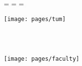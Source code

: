 \begin{titlepage}
  \oddsidemargin=\evensidemargin\relax
  \textwidth=\dimexpr{}\evensidemargin-2in\relax
  \hsize=\textwidth\relax

  \centering

  \texttt{[image: pages/tum]}

  \vspace{5mm}
  {\LARGE\MakeUppercase{\getFacultyTUM{}}}\\

  \vspace{5mm}
  {\large\MakeUppercase{\getUniversityTUM{}}}\\

  \vspace{20mm}
  {\Large\getDoctypeTUM{}}

  \vspace{15mm}
  {\huge\bfseries \getTitle{}\par}

  \vspace{15mm}
  {\LARGE\getAuthor{}}

  \vspace{20mm}
  \texttt{[image: pages/faculty]}
\end{titlepage}
